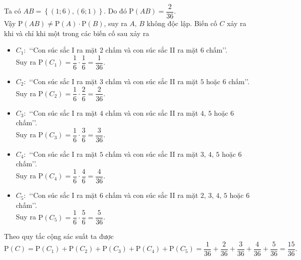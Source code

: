 \begin{ex}
{\begin{itemchoice}
   Ta có $AB=\left\{(1;6),(6;1) \right\}$. Do đó $\mathrm{P}(AB)=\dfrac{2}{36}$.\\ 
   Vậy $\mathrm{P}(AB)\ne \mathrm{P}(A)\cdot\mathrm{P}(B)$, suy ra $A,\,B$ không độc lập. 
   \itemch Biến cố $C$ xảy ra khi và  chỉ khi một trong các biến cố sau xảy ra
   \begin{itemize}
    \item $C_1\colon$  \lq\lq Con súc sắc I ra mặt $2$ chấm và con súc sắc II ra mặt $6$ chấm\rq\rq.\\
    Suy  ra $\mathrm{P}\left(C_1 \right)=\dfrac{1}{6}\cdot\dfrac{1}{6}=\dfrac{1}{36}$.
    \item $C_2\colon$ \lq\lq Con súc sắc I ra mặt $3$ chấm và con  súc sắc II ra mặt $5$ hoặc $6$ chấm\rq\rq.\\
    Suy ra $\mathrm{P}\left(C_2  \right)=\dfrac{1}{6}\cdot\dfrac{2}{6}=\dfrac{2}{36}$.
    \item $C_3\colon$ \lq\lq Con súc  sắc I ra mặt $4$ chấm và con súc sắc II ra mặt $4,\,5$ hoặc $6$ chấm\rq\rq.\\
    Suy  ra $\mathrm{P}\left(C_3 \right)=\dfrac{1}{6}\cdot\dfrac{3}{6}=\dfrac{3}{36}$.
    \item $C_4\colon$  \lq\lq Con súc sắc I ra mặt $5$ chấm và con súc sắc II ra mặt $3,\,4,\,5$ hoặc $6$ chấm\rq\rq.\\
    Suy ra  $\mathrm{P}\left(C_4 \right)=\dfrac{1}{6}\cdot\dfrac{4}{6}=\dfrac{4}{36}$.
    \item $C_5\colon$ \lq\lq Con súc sắc I ra mặt $6$ chấm và con súc sắc  II ra mặt $2,\,3,\,4,\,5$ hoặc $6$ chấm\rq\rq.\\
    Suy ra $\mathrm{P}\left(C_5  \right)=\dfrac{1}{6}\cdot\dfrac{5}{6}=\dfrac{5}{36}$.
   \end{itemize}
   Theo quy tắc cộng  sác suất ta được
   $$\mathrm{P}(C)=\mathrm{P}\left(C_1  \right)+\mathrm{P}\left(C_2 \right)+\mathrm{P}\left(C_3 \right)+\mathrm{P}\left(C_4 \right)+\mathrm{P}\left(C_5 \right)=\dfrac{1}{36}+\dfrac{2}{36}+\dfrac{3}{36}+\dfrac{4}{36}+\dfrac{5}{36}=\dfrac{15}{36}.$$
  \end{itemchoice}
 } 
\end{ex}

